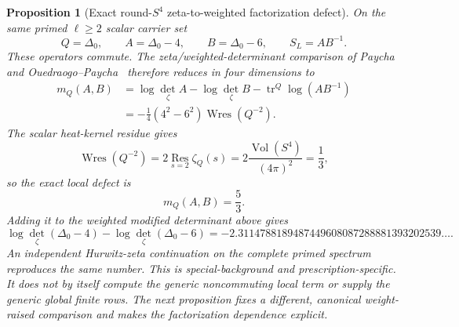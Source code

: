 \documentclass[11pt]{article}
\newtheorem{proposition}[theorem]{Proposition}
\theoremstyle{definition}
\theoremstyle{remark}
\begin{document}
\begin{proposition}[Exact round-$S^4$ zeta-to-weighted factorization defect]
On the same primed $\ell\geq2$ scalar carrier set
\[
 Q=\Delta_0,\qquad A=\Delta_0-4,\qquad B=\Delta_0-6,
 \qquad S_L=AB^{-1}.
\]
These operators commute.  The zeta/weighted-determinant comparison
of Paycha and Ouedraogo--Paycha~\cite{PaychaWeightedTrace,OuedraogoPaycha}
therefore reduces in four dimensions to
\[
 \begin{split}
 m_Q(A,B)&=\log\det_\zeta A-\log\det_\zeta B
             -\operatorname{tr}^Q\log(AB^{-1})\\
 &=-\frac14(4^2-6^2)\operatorname{Wres}(Q^{-2}).
 \end{split}
\]
The scalar heat-kernel residue gives
\[
 \operatorname{Wres}(Q^{-2})
 =2\operatorname*{Res}_{s=2}\zeta_Q(s)
 =2\frac{\operatorname{Vol}(S^4)}{(4\pi)^2}=\frac13,
\]
so the exact local defect is
\[
 \boxed{m_Q(A,B)=\frac53.}
\]
Adding it to the weighted modified determinant above gives
\[
 \boxed{
 \log\det_\zeta(\Delta_0-4)-\log\det_\zeta(\Delta_0-6)
 =-2.3114788189487449608087288881393202539\ldots .}
\]
An independent Hurwitz-zeta continuation on the complete primed spectrum
reproduces the same number.  This is special-background and
prescription-specific.  It does not by itself compute the generic
noncommuting local term or supply the generic global finite rows.  The next
proposition fixes a different, canonical weight-raised comparison and makes
the factorization dependence explicit.
\end{proposition}
\end{document}
